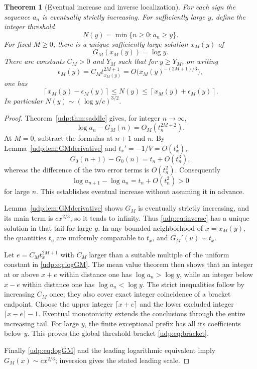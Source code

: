 \documentclass[11pt]{article}
\newtheorem{theorem}{Theorem}[section]
\theoremstyle{remark}\newtheorem{remark}[theorem]{Remark}
\numberwithin{equation}{section}
\begin{document}
\begin{theorem}[Eventual increase and inverse localization]\label{udp:thm:inverse}
For each sign the sequence $a_n$ is eventually strictly increasing. For sufficiently large $y$, define the integer threshold
\[
 N(y)=\min\{n\ge0:a_n\ge y\}.
\]
For fixed $M\ge0$, there is a unique sufficiently large solution $x_M(y)$ of
\begin{equation}\label{udp:eq:inverse}
 G_M(x_M(y))=\log y.
\end{equation}
There are constants $C_M>0$ and $Y_M$ such that for $y\ge Y_M$, on writing
\[
 \epsilon_M(y)=C_Mt_{x_M(y)}^{2M+1}
 =O\bigl(x_M(y)^{-(2M+1)/3}\bigr),
\]
one has
\begin{equation}\label{udp:eq:bracket}
 \left\lceil x_M(y)-\epsilon_M(y)\right\rceil
 \le N(y)\le
 \left\lceil x_M(y)+\epsilon_M(y)\right\rceil.
\end{equation}
In particular $N(y)\sim(\log y/c)^{3/2}$.
\end{theorem}
\begin{proof}
Theorem~\ref{udp:thm:saddle} gives, for integer $n\to\infty$,
\begin{equation}\label{udp:eq:logGM}
 \log a_n-G_M(n)=O_M(t_n^{2M+2}).
\end{equation}
At $M=0$, subtract the formulas at $n+1$ and $n$. By Lemma~\ref{udp:lem:GMderivative} and $t_x'=-1/V=O(t_x^4)$,
\[
 G_0(n+1)-G_0(n)=t_n+O(t_n^3),
\]
whereas the difference of the two error terms is $O(t_n^2)$. Consequently
\[
 \log a_{n+1}-\log a_n=t_n+O(t_n^2)>0
\]
for large $n$. This establishes eventual increase without assuming it in advance.

Lemma~\ref{udp:lem:GMderivative} shows $G_M$ is eventually strictly increasing, and its main term is $cx^{2/3}$, so it tends to infinity. Thus \eqref{udp:eq:inverse} has a unique solution in that tail for large $y$. In any bounded neighborhood of $x=x_M(y)$, the quantities $t_u$ are uniformly comparable to $t_x$, and $G_M'(u)\sim t_x$.

Let $e=C_Mt_x^{2M+1}$ with $C_M$ larger than a suitable multiple of the uniform constant in \eqref{udp:eq:logGM}. The mean value theorem then shows that an integer at or above $x+e$ within distance one has $\log a_n>\log y$, while an integer below $x-e$ within distance one has $\log a_n<\log y$. The strict inequalities follow by increasing $C_M$ once; they also cover exact integer coincidence of a bracket endpoint. Choose the upper integer $\lceil x+e\rceil$ and the lower excluded integer $\lceil x-e\rceil-1$. Eventual monotonicity extends the conclusions through the entire increasing tail. For large $y$, the finite exceptional prefix has all its coefficients below $y$. This proves the global threshold bracket \eqref{udp:eq:bracket}.

Finally \eqref{udp:eq:logGM} and the leading logarithmic equivalent imply $G_M(x)\sim cx^{2/3}$; inversion gives the stated leading scale.
\end{proof}
\end{document}
